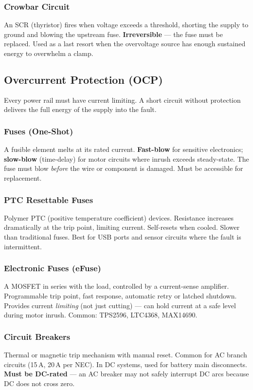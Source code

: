 \documentclass[11pt,letterpaper,twoside,openany]{book}
\begin{document}
\subsubsection{Crowbar Circuit}
An SCR (thyristor) fires when voltage exceeds a threshold, shorting the supply to ground and blowing the upstream fuse. \textbf{Irreversible} --- the fuse must be replaced. Used as a last resort when the overvoltage source has enough sustained energy to overwhelm a clamp.


\subsection{Overcurrent Protection (OCP)}
\label{sec:ocp}

Every power rail must have current limiting. A short circuit without protection delivers the full energy of the supply into the fault.

\subsubsection{Fuses (One-Shot)}
A fusible element melts at its rated current. \textbf{Fast-blow} for sensitive electronics; \textbf{slow-blow} (time-delay) for motor circuits where inrush exceeds steady-state. The fuse must blow \emph{before} the wire or component is damaged. Must be accessible for replacement.

\subsubsection{PTC Resettable Fuses}
Polymer PTC (positive temperature coefficient) devices. Resistance increases dramatically at the trip point, limiting current. Self-resets when cooled. Slower than traditional fuses. Best for USB ports and sensor circuits where the fault is intermittent.

\subsubsection{Electronic Fuses (eFuse)}
A MOSFET in series with the load, controlled by a current-sense amplifier. Programmable trip point, fast response, automatic retry or latched shutdown. Provides current \emph{limiting} (not just cutting) --- can hold current at a safe level during motor inrush. Common: TPS2596, LTC4368, MAX14690.

\subsubsection{Circuit Breakers}
Thermal or magnetic trip mechanism with manual reset. Common for AC branch circuits (15\,A, 20\,A per NEC). In DC systems, used for battery main disconnects. \textbf{Must be DC-rated} --- an AC breaker may not safely interrupt DC arcs because DC does not cross zero.
\end{document}
